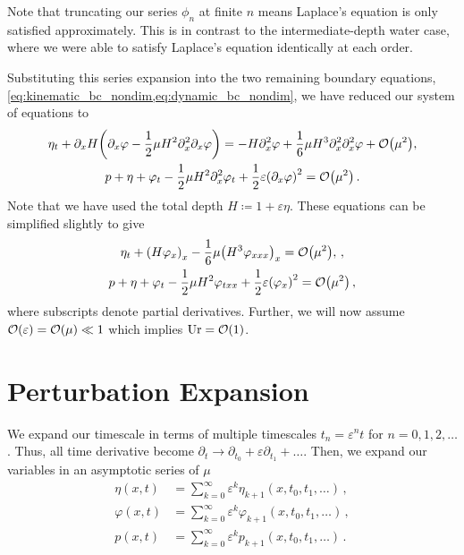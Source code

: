 \documentclass{jfm}
\DeclareMathOperator{\Ur}{Ur}
\renewcommand*{\epsilon}{\varepsilon}
\begin{document}
Note that truncating our series $\phi_n$ at finite $n$ means
Laplace's equation is only satisfied approximately.
This is in contrast to the intermediate-depth water case, where we were
able to satisfy Laplace's equation identically at each order.

Substituting this series expansion into the two
remaining boundary equations,
\cref{eq:kinematic_bc_nondim,eq:dynamic_bc_nondim}, we have reduced our
system of equations to
\begin{gather}
  \eta_t + \partial_x{H}\pqty{\partial_x\varphi
    -\frac{1}{2}\mu H^2\partial^2_x\partial_x\varphi} =
    -H\partial^2_x\varphi
  +\frac{1}{6}\mu H^3\partial^2_x\partial^2_x\varphi +
    \order{\mu^2}, \\
  p + \eta + \varphi_{t} - \frac{1}{2}\mu H^2\partial^2_x\varphi_{t} +
    \frac{1}{2}\epsilon \pqty{\partial_x\varphi}^2 = \order{\mu^2}
    \,.
\end{gather}
Note that we have used the total depth $H\coloneqq 1+\epsilon\eta$.
These equations can be simplified slightly to give
\begin{gather}
  \eta_t + \pqty{H\varphi_x}_x
    -\frac{1}{6}\mu \pqty{H^3\varphi_{xxx}}_x =
    \order{\mu^2}, \label{eq:kinematic_bc_varphi} \,, \\
  p + \eta + \varphi_t - \frac{1}{2}\mu H^2\varphi_{txx} +
    \frac{1}{2}\epsilon\pqty{\varphi_x}^2 = \order{\mu^2} \,,
  \label{eq:dynamic_bc_varphi}
\end{gather}
where subscripts denote partial derivatives.
Further, we will now assume $\order{\epsilon} = \order{\mu} \ll 1$ which
implies $\Ur = \order{1}$.

\section{Perturbation Expansion}
\label{sec:shallow_water}
We expand our timescale in terms of multiple timescales $t_n =
\epsilon^n t$ for $n= 0,1,2,\ldots$.
Thus, all time derivative become $\partial_t \to \partial_{t_0} +
\epsilon \partial_{t_1} + \ldots$.
Then, we expand our variables in an asymptotic series of $\mu$
\begin{align}
  \eta(x,t) &= \sum_{k=0}^{\infty} \epsilon^k
    \eta_{k+1}(x,t_0,t_1,\ldots) \,, \\
  \varphi(x,t) &= \sum_{k=0}^{\infty} \epsilon^k
    \varphi_{k+1}(x,t_0,t_1,\ldots) \,, \\
  p(x,t) &= \sum_{k=0}^{\infty} \epsilon^k p_{k+1}(x,t_0,t_1,\ldots)
    \,.
\end{align}
\end{document}
